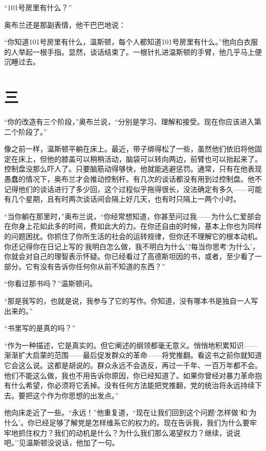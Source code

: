 ``101号房里有什么？''

奥布兰还是那副表情，他干巴巴地说：

``你知道101号房里有什么，温斯顿，每个人都知道101号房里有什么。''他向白衣服的人举起一根手指。显然，谈话结束了。一根针扎进温斯顿的手臂，他几乎马上便沉睡过去。

\section*{三}\label{ux4e8cux5341ux4e00}

``你的改造有三个阶段，''奥布兰说，``分别是学习、理解和接受。现在你应该进入第二个阶段了。''

像之前一样，温斯顿平躺在床上。最近，带子绑得松了一些，虽然他们依旧将他固定在床上，但他的膝盖可以稍稍活动，脑袋可以转向两边，前臂也可以抬起来了。控制盘没那么吓人了。只要脑筋动得够快，他就能逃避惩罚。通常，只有在他表现愚蠢的情况下，奥布兰才会推动控制杆。有几次的谈话都没有用到过控制盘。他不记得他们的谈话进行了多少回，这个过程似乎拖得很长，没法确定有多久——可能有几个星期，且有时两次谈话间会隔上好几天，也有时只隔上一两个小时。

``当你躺在那里时，''奥布兰说，``你经常想知道，你甚至问过我——为什么仁爱部会在你身上花如此多的时间，费如此大的力。在你还自由的时候，基本上你也为同样的问题困扰。你抓住了你所生活的社会的运转规律，但你还不理解它的根本动机。你还记得你在日记上写的`我明白怎么做，我不明白为什么'?每当你思考`为什么'，你就会对自己的理智表示怀疑。你已经看过了高德斯坦因的书，或者，至少看了一部分。它有没有告诉你任何你从前不知道的东西？''

``你看过那书吗？''温斯顿问。

``那是我写的，也就是说，我参与了它的写作。你知道，没有哪本书是独自一人写出来的。''

``书里写的是真的吗？''

``作为一种描述，它是真实的。但它阐述的纲领都毫无意义。悄悄地积累知识——渐渐扩大启蒙的范围——最后促发群众的革命——将党推翻。看这书之前你就知道它会这么说。这都是胡说的。群众永远不会造反，再过一千年、一百万年都不会。他们不能这么做，我也不用告诉你原因，你已经知道了。如果你曾经对暴力革命抱有什么希望，你必须将它丢掉。没有任何方法能把党推翻，党的统治将永远持续下去。要把这个作为你思想的出发点。''

他向床走近了一些。``永远！''他重复道，``现在让我们回到这个问题`怎样做'和`为什么'。你已经足够了解党是怎样维系它的权力的。现在告诉我，我们为什么要牢牢地抓住权力？我们的动机是什么？为什么我们那么渴望权力？继续，说说吧。''见温斯顿没说话，他加了一句。

